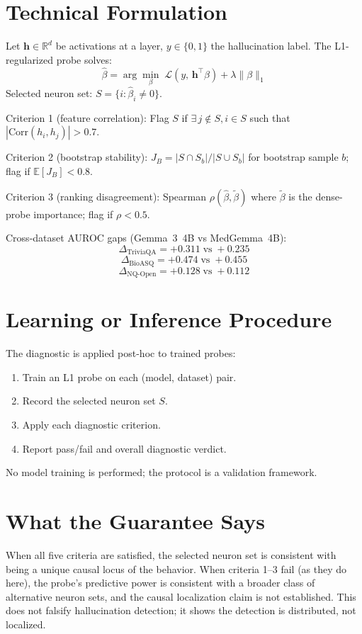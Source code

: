 \documentclass[10pt,twocolumn]{article}
\begin{document}
\section{Technical Formulation}

Let $\mathbf{h} \in \mathbb{R}^d$ be activations at a layer, $y \in \{0,1\}$
the hallucination label. The L1-regularized probe solves:
\[
\hat{\beta} = \arg\min_\beta \;\mathcal{L}(y,\, \mathbf{h}^\top\beta)
  + \lambda \|\beta\|_1
\]
Selected neuron set: $S = \{i : \hat{\beta}_i \neq 0\}$.

Criterion 1 (feature correlation): Flag $S$ if
$\exists\, j \notin S, i \in S$ such that $|\text{Corr}(h_i, h_j)| > 0.7$.

Criterion 2 (bootstrap stability): $J_B = |S \cap S_b| / |S \cup S_b|$
for bootstrap sample $b$; flag if $\mathbb{E}[J_B] < 0.8$.

Criterion 3 (ranking disagreement): Spearman $\rho(\hat{\beta},
\tilde{\beta})$ where $\tilde{\beta}$ is the dense-probe importance;
flag if $\rho < 0.5$.

Cross-dataset AUROC gaps (Gemma~3~4B vs MedGemma~4B):
\[
\Delta_\text{TriviaQA} = +0.311 \;\text{vs}\; +0.235
\]
\[
\Delta_\text{BioASQ} = +0.474 \;\text{vs}\; +0.455
\]
\[
\Delta_\text{NQ-Open} = +0.128 \;\text{vs}\; +0.112
\]

\section{Learning or Inference Procedure}

The diagnostic is applied post-hoc to trained probes:
\begin{enumerate}[itemsep=2pt,parsep=0pt]
  \item Train an L1 probe on each (model, dataset) pair.
  \item Record the selected neuron set $S$.
  \item Apply each diagnostic criterion.
  \item Report pass/fail and overall diagnostic verdict.
\end{enumerate}
No model training is performed; the protocol is a validation framework.

\section{What the Guarantee Says}

When all five criteria are satisfied, the selected neuron set is consistent
with being a unique causal locus of the behavior. When criteria 1--3 fail
(as they do here), the probe's predictive power is consistent with a broader
class of alternative neuron sets, and the causal localization claim is not
established. This does not falsify hallucination detection; it shows the
detection is distributed, not localized.
\end{document}
